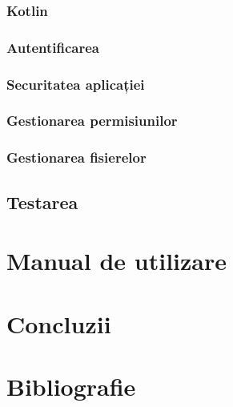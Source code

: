 \documentclass[12pt]{article}
\begin{document}
\subsubsection{Kotlin}
\subsubsection{Autentificarea}
\subsubsection{Securitatea aplicației}
\subsubsection{Gestionarea permisiunilor}
\subsubsection{Gestionarea fisierelor}

\subsection{Testarea}

\section{Manual de utilizare}

\section{Concluzii}

\newpage

\section{Bibliografie}
\nocite{owasp-top10-2017}
\nocite{owasp-top10-mobile}
\nocite{3ways-auth}
\nocite{rfc-7519}
\nocite{jwt}
\nocite{enisa-2017}
\nocite{enisa-security-data-processing}
\nocite{goldberg1998comparison}
\nocite{felt2017measuring}
\nocite{fette2011websocket}
\nocite{erkkila2012websocket}
\nocite{test-ws}

\nocite{kahn2010mobile}
\nocite{barton2012regulation}

\nocite{masse2011rest}
\printbibliography[title=Bibliografie]
\end{document}
